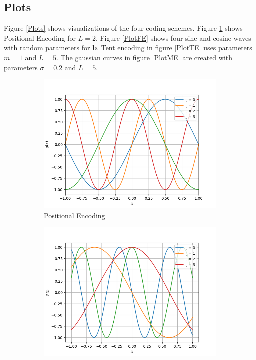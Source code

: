 \documentclass{article}
\begin{document}
\subsection{Plots}
\label{subsecPlots}
Figure \ref{Plots} shows visualizations of the four coding schemes. Figure \ref{PlotPE} shows Positional Encoding for $L=2$. Figure \ref{PlotFE} shows four sine and cosine waves with random parameters for \textbf{b}. Tent encoding in figure \ref{PlotTE} uses parameters $m=1$ and $L=5$. The gaussian curves in figure \ref{PlotME} are created with parameters $\sigma=0.2$ and $L=5$.
\begin{figure}[!h]
  \begin{subfigure}{.5\textwidth}
  \includegraphics[width=\textwidth]{Bilder/plot_positional.png}
  \caption{Positional Encoding}
  \label{PlotPE}
\end{subfigure}
\begin{subfigure}{.5\textwidth}
  \includegraphics[width=\textwidth]{Bilder/plot_fourier.png}

\end{subfigure}
\end{figure}
\end{document}

